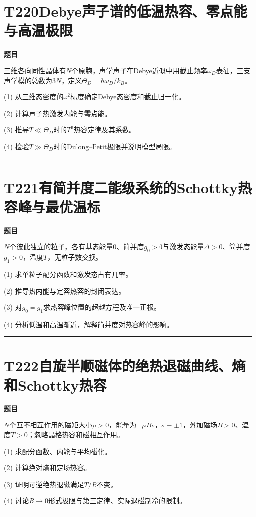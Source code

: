 \documentclass[UTF8,a4paper,11pt,oneside,openany]{ctexbook}
\begin{document}
\section*{T220\quad Debye声子谱的低温热容、零点能与高温极限}
\textbf{题目}\par
三维各向同性晶体有$N$个原胞，声学声子在Debye近似中用截止频率$\omega_D$表征，三支声学模的总数为$3N$，定义$\Theta_D=\hbar\omega_D/k_B$。
\par\smallskip\noindent (1) 从三维态密度的$\omega^2$标度确定Debye态密度和截止归一化。
\par\smallskip\noindent (2) 计算声子热激发内能与零点能。
\par\smallskip\noindent (3) 推导$T\ll\Theta_D$时的$T^3$热容定律及其系数。
\par\smallskip\noindent (4) 检验$T\gg\Theta_D$时的Dulong–Petit极限并说明模型局限。
\par\medskip\hrule\medskip
\section*{T221\quad 有简并度二能级系统的Schottky热容峰与最优温标}
\textbf{题目}\par
$N$个彼此独立的粒子，各有基态能量0、简并度$g_0>0$与激发态能量$\Delta>0$、简并度$g_1>0$，温度$T$，无粒子数交换。
\par\smallskip\noindent (1) 求单粒子配分函数和激发态占有几率。
\par\smallskip\noindent (2) 推导热内能与定容热容的封闭表达。
\par\smallskip\noindent (3) 对$g_0=g_1$求热容峰位置的超越方程及唯一正根。
\par\smallskip\noindent (4) 分析低温和高温渐近，解释简并度对热容峰的影响。
\par\medskip\hrule\medskip
\section*{T222\quad 自旋半顺磁体的绝热退磁曲线、熵和Schottky热容}
\textbf{题目}\par
$N$个互不相互作用的磁矩大小$\mu>0$，能量为$-\mu Bs$，$s=\pm1$，外加磁场$B>0$、温度$T>0$；忽略晶格热容和磁相互作用。
\par\smallskip\noindent (1) 求配分函数、内能与平均磁化。
\par\smallskip\noindent (2) 计算绝对熵和定场热容。
\par\smallskip\noindent (3) 证明可逆绝热退磁满足$T/B$不变。
\par\smallskip\noindent (4) 讨论$B\to0$形式极限与第三定律、实际退磁制冷的限制。
\par\medskip\hrule\medskip
\end{document}
